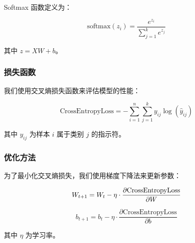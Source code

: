 \documentclass[a4paper,12pt]{article}
\begin{document}
Softmax 函数定义为：

\begin{equation}
	\text{softmax}(z_i) = \frac{e^{z_i}}{\sum_{j=1}^k e^{z_j}}
\end{equation}

其中 $z = XW + b$。

\subsubsection{损失函数}
我们使用交叉熵损失函数来评估模型的性能：

\begin{equation}
	\text{CrossEntropyLoss} = -\sum_{i=1}^n \sum_{j=1}^k y_{ij} \log(\hat{y}_{ij})
\end{equation}

其中 $y_{ij}$ 为样本 $i$ 属于类别 $j$ 的指示符。

\subsubsection{优化方法}
为了最小化交叉熵损失，我们使用梯度下降法来更新参数：

\begin{equation}
	W_{t+1} = W_t - \eta \cdot \frac{\partial \text{CrossEntropyLoss}}{\partial W} \\
\end{equation}

\begin{equation}
	b_{t+1} = b_t - \eta \cdot \frac{\partial \text{CrossEntropyLoss}}{\partial b}
\end{equation}

其中 $\eta$ 为学习率。
\end{document}
